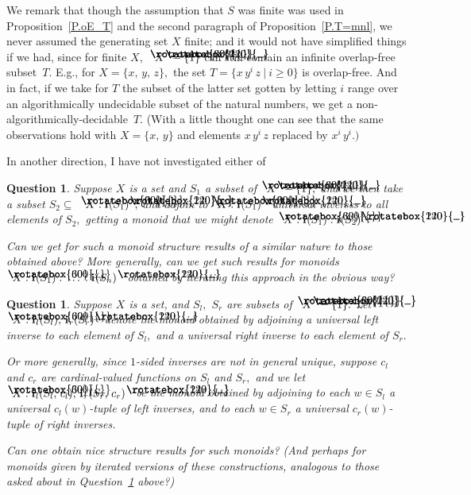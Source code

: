 \documentclass{amsart}
\newtheorem{question}[equation]{Question}
\numberwithin{equation}{section}
\newcommand{\I}{\mathbf{i}\hspace{.05em}}
\newcommand{\langl}{\begin{picture}(.51em,1em)
\put(.11em,.33em){\rotatebox{60}{\line(1,0){.55em}}}
\put(.11em,.33em){\rotatebox{300}{\line(1,0){.55em}}}
\end{picture}}
\newcommand{\rangl}{\begin{picture}(.5em,1em)
\put(.09em,.33em){\rotatebox{120}{\line(1,0){.55em}}}
\put(.09em,.33em){\rotatebox{240}{\line(1,0){.55em}}}
\end{picture}}
\begin{document}
We remark that though the assumption that $S$ was finite
was used in Proposition~\ref{P.oE_T}
and the second paragraph of Proposition~\ref{P.T=mnl},
we never assumed the generating
set $X$ finite; and it would not have simplified
things if we had, since for finite $X,$ $\langl X\rangl-\{1\}$
can still contain an infinite overlap-free subset~$T.$
E.g., for $X=\{x,\,y,\,z\},$ the set
$T=\{x\,y^i\,z~|~i\geq 0\}$ is overlap-free.
And in fact, if we take for $T$ the subset
of the latter set gotten by letting $i$ range over an
algorithmically undecidable subset of the natural numbers,
we get a non-algorithmically-decidable~$T.$
(With a little thought one can see that the same observations
hold with $X=\{x,\,y\}$ and elements $x\,y^i\,z$ replaced
by $x^i\,y^i.)$

In another direction, I have not investigated either of
%
\begin{question}\label{Q.iterate}
Suppose $X$ is a set and $S_1$ a subset of $\langl X\rangl-\{1\},$ and
we then take a subset $S_2\subseteq$ \mbox{$\langl X:\I(S_1)\rangl,$}
and adjoin to $\langl X:\I(S_1)\rangl$ universal
inverses to all elements of $S_2,$ getting a monoid
that we might denote $\langl X:\I(S_1):\I(S_2)\rangl.$

Can we get for such a monoid structure results of a similar
nature to those obtained above?
More generally, can we get such results for monoids
$\langl X:\I(S_1):\,\ldots\,:\I(S_n)\rangl$ obtained
by iterating this approach in the obvious way?
\end{question}

\begin{question}\label{Q.1-sided}
Suppose $X$ is a set, and $S_l,$ $S_r$ are subsets
of $\langl X\rangl-\{1\}.$
Let $\langl X:\I_l(S_l),\,\I_r(S_r)\rangl$
denote the monoid obtained by adjoining
a universal {\em left} inverse to each element of $S_l,$ and
a universal {\em right} inverse to each element of $S_r.$

Or more generally, since $\!1\!$-sided inverses are not
in general unique, suppose $c_l$ and $c_r$ are cardinal-valued
functions on $S_l$ and $S_r,$ and we
let $\langl X:\I_l(S_l,\,c_l),\,\I_r(S_r,\,c_r)\rangl$
be the monoid obtained by adjoining to each $w\in S_l$
a universal $\!c_l(w)\!$-tuple of left inverses, and to each
$w\in S_r$ a universal $\!c_r(w)\!$-tuple of right inverses.

Can one obtain nice structure results for such monoids?
{\rm(}And perhaps for monoids given
by iterated versions of these constructions, analogous
to those asked about in Question~\ref{Q.iterate} above?{\rm)}
\end{question}
\end{document}
